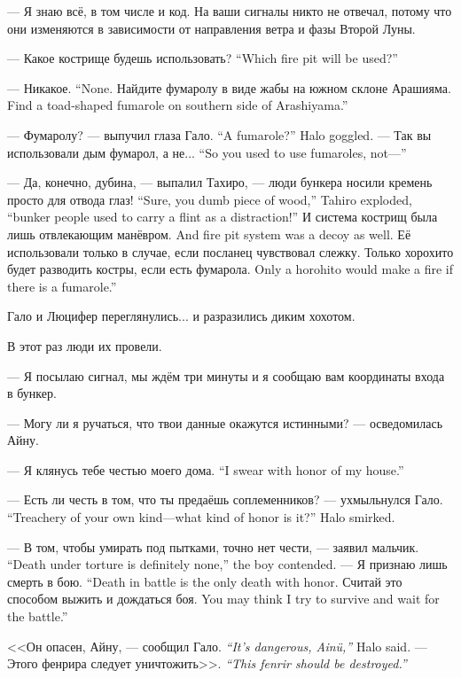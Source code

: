 --- Я знаю всё, в том числе и код.
На ваши сигналы никто не отвечал, потому что они изменяются в зависимости от направления ветра и фазы Второй Луны.

{--- Какое кострище будешь использовать?}
{``Which fire pit will be used?''}

{--- Никакое.}
{``None.}
{Найдите фумаролу в виде жабы на южном склоне Арашияма.}
{Find a toad-shaped fumarole on southern side of Arashiyama.''}

{--- Фумаролу? --- выпучил глаза Гало.}
{``A fumarole?'' Halo goggled.}
{--- Так вы использовали дым фумарол, а не...}
{``So you used to use fumaroles, not---''}

{--- Да, конечно, дубина, --- выпалил Тахиро, --- люди бункера носили кремень просто для отвода глаз!}
{``Sure, you dumb piece of wood,'' Tahiro exploded, ``bunker people used to carry a flint as a distraction!''}
{И система кострищ была лишь отвлекающим манёвром.}
{And fire pit system was a decoy as well.}
Её использовали только в случае, если посланец чувствовал слежку.
{Только хорохито будет разводить костры, если есть фумарола.}
{Only a horohito would make a fire if there is a fumarole.''}

Гало и Люцифер переглянулись... и разразились диким хохотом.

В этот раз люди их провели.

\asterism

--- Я посылаю сигнал, мы ждём три минуты и я сообщаю вам координаты входа в бункер.

--- Могу ли я ручаться, что твои данные окажутся истинными? --- осведомилась Айну.

{--- Я клянусь тебе честью моего дома.}
{``I swear with honor of my house.''}

{--- Есть ли честь в том, что ты предаёшь соплеменников? --- ухмыльнулся Гало.}
{``Treachery of your own kind---what kind of honor is it?'' Halo smirked.}

{--- В том, чтобы умирать под пытками, точно нет чести, --- заявил мальчик.}
{``Death under torture is definitely none,'' the boy contended.}
{--- Я признаю лишь смерть в бою.}
{``Death in battle is the only death with honor.}
{Считай это способом выжить и дождаться боя.}
{You may think I try to survive and wait for the battle.''}

{<<Он опасен, Айну, --- сообщил Гало.}
{\textit{``It's dangerous, Ain\"{u},''} Halo said.}
{--- Этого фенрира\FM{} следует уничтожить>>.}
{\textit{``This fenrir\FM{} should be destroyed.''}}

